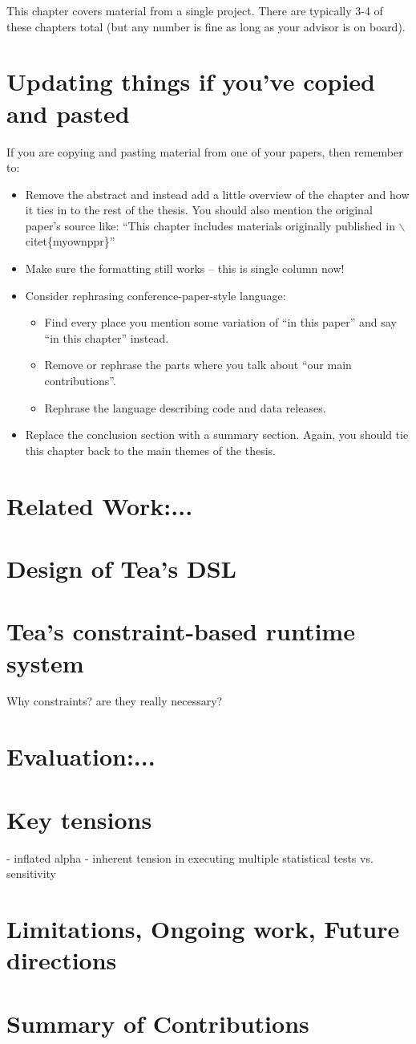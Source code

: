This chapter covers material from a single project.  There are typically 3-4 of these chapters total (but any number is fine as long as your advisor is on board).


\section{Updating things if you've copied and pasted}
If you are copying and pasting material from one of your papers, then remember to:
\begin{itemize}
    \item Remove the abstract and instead add a little overview of the chapter and how it ties in to the rest of the thesis. You should also mention the original paper's source like: ``This chapter includes materials originally published in $\backslash$citet\{myownppr\}''
    \item Make sure the formatting still works -- this is single column now!
    \item Consider rephrasing conference-paper-style language:
    \begin{itemize}
        \item Find every place you mention some variation of ``in this paper'' and say ``in this chapter'' instead.
        \item Remove or rephrase the parts where you talk about ``our main contributions''.
        \item Rephrase the language describing code and data releases.
    \end{itemize}
    \item Replace the conclusion section with a summary section. Again, you should tie this chapter back to the main themes of the thesis.
\end{itemize}


\section{Related Work:...}
\section{Design of Tea's DSL}
\section{Tea's constraint-based runtime system}
Why constraints? are they really necessary?
\section{Evaluation:...}
\section{Key tensions}
- inflated alpha
- inherent tension in executing multiple statistical tests vs. sensitivity
\section{Limitations, Ongoing work, Future directions}
\section{Summary of Contributions}